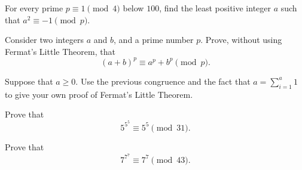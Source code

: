 \exercises

\begin{starter}
  \exercise For every prime $p\equiv 1\pmod{4}$ below $100$, find the least positive integer $a$ such that $a^2\equiv -1\pmod{p}$.
  \exercise
  \begin{subexenum}
  \item Consider two integers $a$ and $b$, and a prime number $p$. Prove, without using Fermat's Little Theorem, that
    \begin{equation*}
      (a+b)^p\equiv a^p+b^p\pmod{p}.
    \end{equation*}
  \item Suppose that $a\geq 0$. Use the previous congruence and the fact that $a=\sum_{i=1}^a1$ to give your own proof of Fermat's Little Theorem.
  \end{subexenum}
  \exercise
  \begin{subexenum}
  \item Prove that
    \begin{equation*}
      5^{5^5}\equiv 5^5\pmod{31}.
    \end{equation*}
  \item Prove that
    \begin{equation*}
      7^{7^7}\equiv 7^7\pmod{43}.
    \end{equation*}
  \end{subexenum}
\end{starter}

